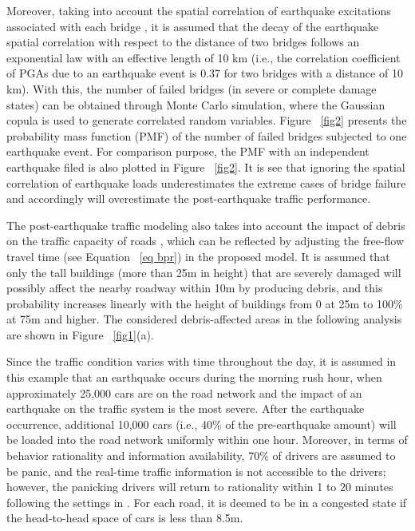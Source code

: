 \documentclass[review,11pt,nonatbib]{elsarticle}
\begin{document}
Moreover, taking into account the spatial correlation of earthquake excitations associated with each bridge \citep{wang2005macrospatial,jayaram2009correlation}, it is assumed that the decay of the earthquake spatial correlation with respect to the distance of two bridges follows an exponential law with an effective length of 10 km (i.e., the correlation coefficient of PGAs due to an earthquake event is 0.37 for two bridges with a distance of 10 km). With this, the number of failed bridges (in severe or complete damage states) can be obtained through Monte Carlo simulation, where the Gaussian copula \citep{nelsen1999introduction} is used to generate correlated random variables. Figure ~\ref{fig2} presents the probability mass function (PMF) of the number of failed bridges subjected to one earthquake event. For comparison purpose, the PMF with an independent earthquake filed is also plotted in Figure ~\ref{fig2}. It is see that ignoring the spatial correlation of earthquake loads underestimates the extreme cases of bridge failure and accordingly will overestimate the post-earthquake traffic performance.
\par The post-earthquake traffic modeling also takes into account the impact of debris on the traffic capacity of roads \citep{roess2011traffic}, which can be reflected by adjusting the free-flow travel time (see Equation ~\eqref{eq bpr}) in the proposed model. It is assumed that only the tall buildings (more than 25m in height) that are severely damaged will possibly affect the nearby roadway within 10m by producing debris, and this probability increases linearly with the height of buildings from 0 at 25m to 100\% at 75m and higher. The considered debris-affected areas in the following analysis are shown in Figure ~\ref{fig1}(a).
\par Since the traffic condition varies with time throughout the day, it is assumed in this example that an earthquake occurs during the morning rush hour, when approximately 25,000 cars are on the road network and the impact of an earthquake on the traffic system is the most severe. After the earthquake occurrence, additional 10,000 cars (i.e., $40\%$ of the pre-earthquake amount) will be loaded into the road network uniformly within one hour. Moreover, in terms of behavior rationality and information availability,  70\% of drivers are assumed to be panic, and the real-time traffic information is not accessible to the drivers; however, the panicking drivers will return to rationality within 1 to 20 minutes following the settings in \citep{feng2017post}. For each road, it is deemed to be in a congested state if the head-to-head space of cars is less than 8.5m.  
\end{document}
